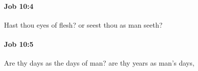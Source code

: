 		\paragraph{Job 10:4} %
			\label{JOB-10-4}

			Hast thou eyes of flesh? or seest thou as man seeth?


		\paragraph{Job 10:5} %
			\label{JOB-10-5}

			Are thy days as the days of man? are thy years as man’s days,


